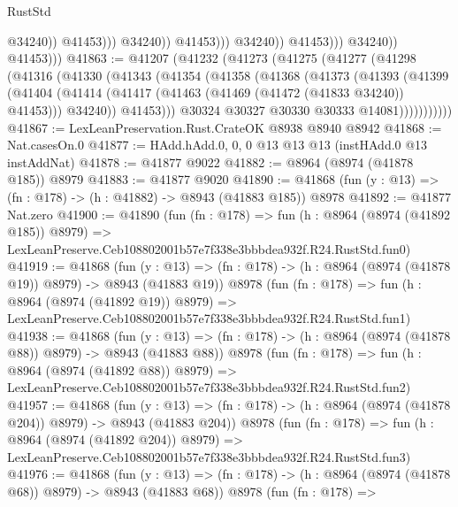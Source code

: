 \begin{lexlean}{RustStd}
\begin{coremodule}
                                            @34240))
                                        @41453)))
                                  @34240))
                              @41453)))
                        @34240))
                    @41453)))
              @34240))
          @41453)))
@41863 := @41207
    (@41232
      (@41273
        (@41275
          (@41277
            (@41298
              (@41316
                (@41330
                  (@41343
                    (@41354
                      (@41358
                        (@41368
                          (@41373
                            (@41393
                              (@41399
                                (@41404
                                  (@41414
                                    (@41417 (@41463 (@41469 (@41472 (@41833 @34240)) @41453)))
                                    @34240))
                                @41453)))
                          @30324
                          @30327
                          @30330
                          @30333
                          @14081)))))))))))
@41867 := LexLeanPreservation.Rust.CrateOK @8938 @8940 @8942
@41868 := Nat.casesOn.{0}
@41877 := HAdd.hAdd.{0, 0, 0} @13 @13 @13 (instHAdd.{0} @13 instAddNat)
@41878 := @41877 @9022
@41882 := @8964 (@8974 (@41878 @185)) @8979
@41883 := @41877 @9020
@41890 := @41868 (fun (y : @13) => (fn : @178) -> (h : @41882) -> @8943 (@41883 @185)) @8978
@41892 := @41877 Nat.zero
@41900 := @41890
    (fun (fn : @178) =>
    fun (h : @8964 (@8974 (@41892 @185)) @8979) =>
    LexLeanPreserve.Ceb108802001b57e7f338e3bbbdea932f.R24.RustStd.fun0)
@41919 := @41868
    (fun (y : @13) => (fn : @178) -> (h : @8964 (@8974 (@41878 @19)) @8979) -> @8943 (@41883 @19))
    @8978
    (fun (fn : @178) =>
    fun (h : @8964 (@8974 (@41892 @19)) @8979) =>
    LexLeanPreserve.Ceb108802001b57e7f338e3bbbdea932f.R24.RustStd.fun1)
@41938 := @41868
    (fun (y : @13) => (fn : @178) -> (h : @8964 (@8974 (@41878 @88)) @8979) -> @8943 (@41883 @88))
    @8978
    (fun (fn : @178) =>
    fun (h : @8964 (@8974 (@41892 @88)) @8979) =>
    LexLeanPreserve.Ceb108802001b57e7f338e3bbbdea932f.R24.RustStd.fun2)
@41957 := @41868
    (fun (y : @13) => (fn : @178) -> (h : @8964 (@8974 (@41878 @204)) @8979) -> @8943 (@41883 @204))
    @8978
    (fun (fn : @178) =>
    fun (h : @8964 (@8974 (@41892 @204)) @8979) =>
    LexLeanPreserve.Ceb108802001b57e7f338e3bbbdea932f.R24.RustStd.fun3)
@41976 := @41868
    (fun (y : @13) => (fn : @178) -> (h : @8964 (@8974 (@41878 @68)) @8979) -> @8943 (@41883 @68))
    @8978
    (fun (fn : @178) =>

\end{coremodule}
\end{lexlean}
